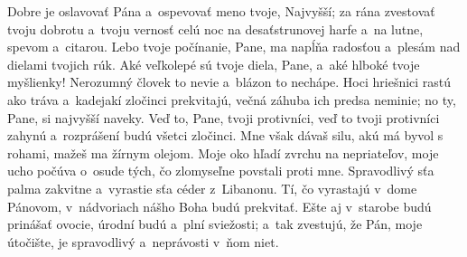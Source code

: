 Dobre je oslavovať Pána
a~ospevovať meno tvoje, Najvyšší;
\versseparator
za rána zvestovať tvoju dobrotu
a~tvoju vernosť celú noc
\versseparator
na desaťstrunovej harfe a~na lutne,
spevom a~citarou.
\versseparator
Lebo tvoje počínanie, Pane, ma napĺňa radosťou
a~plesám nad dielami tvojich rúk.
\versseparator
Aké veľkolepé sú tvoje diela, Pane,
a~aké hlboké tvoje myšlienky!
\versseparator
Nerozumný človek to nevie
a~blázon to nechápe.
\versseparator
Hoci hriešnici rastú ako tráva
a~kadejakí zločinci prekvitajú,
\versseparator
večná záhuba ich predsa neminie;
no ty, Pane, si najvyšší naveky.
\versseparator
Veď to, Pane, tvoji protivníci,
veď to tvoji protivníci zahynú
a~rozprášení budú všetci zločinci.
\versseparator
Mne však dávaš silu, akú má byvol s rohami,
mažeš ma žírnym olejom.
\versseparator
Moje oko hľadí zvrchu na nepriateľov,
moje ucho počúva o~osude tých, čo zlomyseľne povstali proti mne.
\versseparator
Spravodlivý sťa palma zakvitne
a~vyrastie sťa céder z~Libanonu.
\versseparator
Tí, čo vyrastajú v~dome Pánovom,
v~nádvoriach nášho Boha budú prekvitať.
\versseparator
Ešte aj v~starobe budú prinášať ovocie,
úrodní budú a~plní sviežosti;
\versseparator
a~tak zvestujú, že Pán, moje útočište, je spravodlivý
a~neprávosti v~ňom niet.